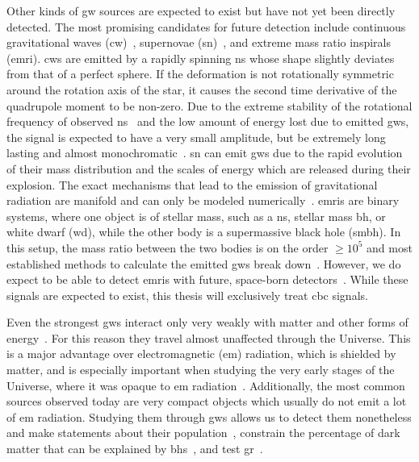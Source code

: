 Other kinds of \acrshort{gw} sources are expected to exist but have not yet been directly detected. The most promising candidates for future detection include continuous gravitational waves (\acrshort{cw})~\cite{Dergachev:2020fli, Steltner:2020hfd, LIGOScientific:2022pjk}, supernovae (\acrshort{sn})~\cite{LIGOScientific:2016jvu}, and extreme mass ratio inspirals (\acrshort{emri})\cite{Maggiore:2018aaa, LISA:2017pwj}. %
 \acrshort{cw}s are emitted by a rapidly spinning \acrshort{ns} whose shape slightly deviates from that of a perfect sphere. If the deformation is not rotationally symmetric around the rotation axis of the star, it causes the second time derivative of the quadrupole moment to be non-zero. Due to the extreme stability of the rotational frequency of observed \acrshort{ns}~\cite{Matsakis:1997aaa, Verbiest:2009aaa} and the low amount of energy lost due to emitted \acrshort{gw}s, the signal is expected to have a very small amplitude, but be extremely long lasting and almost monochromatic~\cite{Lasky:2015uia}. \acrshort{sn} can emit \acrshort{gw}s due to the rapid evolution of their mass distribution and the scales of energy which are released during their explosion. The exact mechanisms that lead to the emission of gravitational radiation are manifold and can only be modeled numerically~\cite{Maggiore:2018aaa}. %
\acrshort{emri}s are binary systems, where one object is of stellar mass, such as a \acrshort{ns}, stellar mass \acrshort{bh}, or white dwarf (\acrshort{wd}), while the other body is a supermassive black hole (\acrshort{smbh}). In this setup, the mass ratio between the two bodies is on the order $\geq 10^5$ and most established methods to calculate the emitted \acrshort{gw}s break down~\cite{Maggiore:2018aaa}. %
However, we do expect to be able to detect \acrshort{emri}s with future, space-born detectors~\cite{LISA:2017pwj}. While these signals are expected to exist, this thesis will exclusively treat \acrshort{cbc} signals.

Even the strongest \acrshort{gw}s interact only very weakly with matter and other forms of energy~\cite{Maggiore:2008aaa}. %
For this reason they travel almost unaffected through the Universe. This is a major advantage over electromagnetic (\acrshort{em}) radiation, which is shielded by matter, and is especially important when studying the very early stages of the Universe, where it was opaque to \acrshort{em} radiation~\cite{Ratra:2007sa}. Additionally, the most common sources observed today are very compact objects which usually do not emit a lot of \acrshort{em} radiation. Studying them through \acrshort{gw}s allows us to detect them nonetheless and make statements about their population~\cite{LIGOScientific:2021psn}, constrain the percentage of dark matter that can be explained by \acrshort{bh}s~\cite{LIGOScientific:2021job}, and test \acrshort{gr}~\cite{LIGOScientific:2016lio, LIGOScientific:2021sio}.

